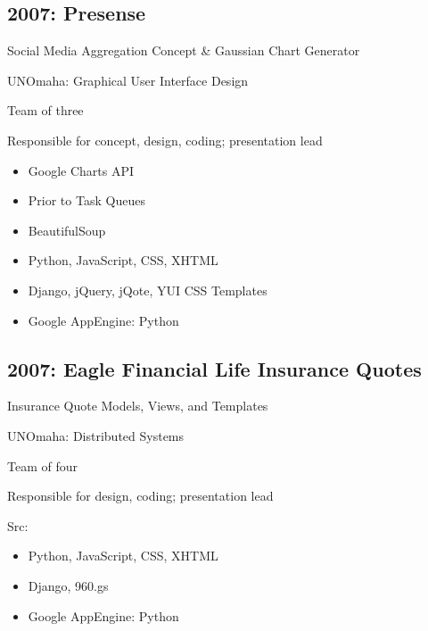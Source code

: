 \documentclass[letter,,openany,oneside,english]{sphinxhowto}
\begin{document}
\subsection{2007: Presense}
\label{\detokenize{resume:presense}}
\begin{DUlineblock}{0em}
\item[] Social Media Aggregation Concept \& Gaussian Chart Generator
\item[] UNOmaha: Graphical User Interface Design
\item[] Team of three
\item[] Responsible for concept, design, coding; presentation lead
\end{DUlineblock}
\begin{itemize}
\item {} 
Google Charts API

\item {} 
Prior to Task Queues

\item {} 
BeautifulSoup

\item {} 
Python, JavaScript, CSS, XHTML

\item {} 
Django, jQuery, jQote, YUI CSS Templates

\item {} 
Google AppEngine: Python

\end{itemize}


\subsection{2007: Eagle Financial Life Insurance Quotes}
\label{\detokenize{resume:eagle-financial-life-insurance-quotes}}
\begin{DUlineblock}{0em}
\item[] Insurance Quote Models, Views, and Templates
\item[] UNOmaha: Distributed Systems
\item[] Team of four
\item[] Responsible for design, coding; presentation lead
\item[] Src: 
\end{DUlineblock}
\begin{itemize}
\item {} 
Python, JavaScript, CSS, XHTML

\item {} 
Django, 960.gs

\item {} 
Google AppEngine: Python

\end{itemize}
\end{document}
